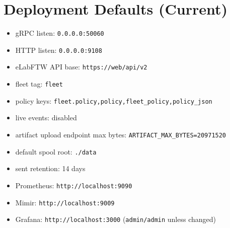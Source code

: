 \documentclass[11pt,a4paper]{article}
\begin{document}
\section{Deployment Defaults (Current)}
\begin{itemize}
  \item gRPC listen: \texttt{0.0.0.0:50060}
  \item HTTP listen: \texttt{0.0.0.0:9108}
  \item eLabFTW API base: \texttt{https://web/api/v2}
  \item fleet tag: \texttt{fleet}
  \item policy keys: \texttt{fleet.policy,policy,fleet\_policy,policy\_json}
  \item live events: disabled
  \item artifact upload endpoint max bytes: \texttt{ARTIFACT\_MAX\_BYTES=20971520}
  \item default spool root: \texttt{./data}
  \item sent retention: 14 days
  \item Prometheus: \texttt{http://localhost:9090}
  \item Mimir: \texttt{http://localhost:9009}
  \item Grafana: \texttt{http://localhost:3000} (\texttt{admin/admin} unless changed)
\end{itemize}
\end{document}
